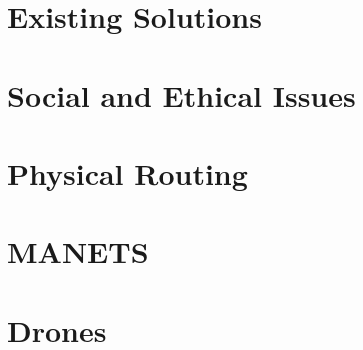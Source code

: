 \section{Existing Solutions}
\section{Social and Ethical Issues}
\section{Physical Routing}
\section{MANETS}
\section{Drones}